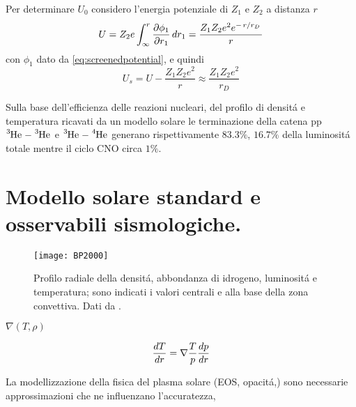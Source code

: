 \documentclass[../main.tex]{subfiles}
\begin{document}
Per determinare $U_0$ considero l'energia potenziale di $Z_1$ e $Z_2$ a distanza $r$
\begin{equation}
U=Z_2e\int_{\infty}^r\PDy{r_1}{\phi_1}\,dr_1=\frac{Z_1Z_2e^2\exp{-\midfrac{r}{r_D}}}{r}
\end{equation}
con $\phi_1$ dato da \eqref{eq:screenedpotential}, e quindi
\begin{equation}
U_s=U-\frac{Z_1Z_2e^2}{r}\approx\frac{Z_1Z_2e^2}{r_D}
\end{equation}

Sulla base dell'efficienza delle reazioni nucleari, del profilo di densit\'a e temperatura ricavati da un modello solare le terminazione della catena pp $\cel{He}{3}{}{}-\cel{He}{3}{}{}$ e $\cel{He}{3}{}{}-\cel{He}{4}{}{}$ generano rispettivamente $83.3\%$, $16.7\%$ della luminosit\'a totale mentre il ciclo CNO circa $1\%$.
\thispagestyle{plain}

{\let\clearpage\relax\let\cleardoublepage\relax
\chapter{Modello solare standard e osservabili sismologiche.}
}

\begin{figure}[!h]
\texttt{[image: BP2000]}
\caption{Profilo radiale della densit\'a, abbondanza di idrogeno, luminosit\'a e temperatura; sono indicati i valori centrali e alla base della zona convettiva. Dati da \cite{BP2000}.}
\end{figure}

\begin{workout}

\end{workout}

\begin{workout}

$\nabla(T,\rho)$

\begin{equation}
\TDy{r}{T}=\nabla\frac{T}{p}\TDy{r}{p}
\end{equation}

\end{workout}

\begin{workout}
La modellizzazione della fisica del plasma solare (EOS, opacit\'a,) sono necessarie approssimazioni che ne influenzano l'accuratezza, 
\end{workout}
\end{document}

